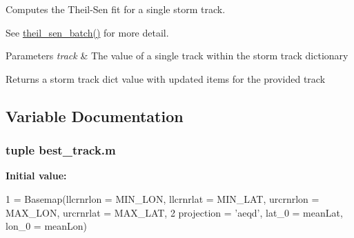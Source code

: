Computes the Theil-\/\-Sen fit for a single storm track. 

See \hyperlink{namespacebest__track_ae3b3ae8d6c815814fe4c07f614024a4a}{theil\-\_\-sen\-\_\-batch()} for more detail. 
\begin{DoxyParams}{Parameters}
{\em track} & The value of a single track within the storm track dictionary \\
\hline
\end{DoxyParams}
\begin{DoxyReturn}{Returns}
a storm track dict value with updated items for the provided track 
\end{DoxyReturn}


\subsection{Variable Documentation}
\hypertarget{namespacebest__track_a655558b5a95d438c69b4a21b3ea00a5f}{
\subsubsection[{m}]{\setlength{\rightskip}{0pt plus 5cm}tuple best\-\_\-track.\-m}}\label{namespacebest__track_a655558b5a95d438c69b4a21b3ea00a5f}
{\bfseries Initial value\-:}
\begin{DoxyCode}
1 = Basemap(llcrnrlon = MIN\_LON, llcrnrlat = MIN\_LAT, urcrnrlon = MAX\_LON, urcrnrlat = MAX\_LAT, 
2                         projection = \textcolor{stringliteral}{'aeqd'}, lat\_0 = meanLat, lon\_0 = meanLon)
\end{DoxyCode}
